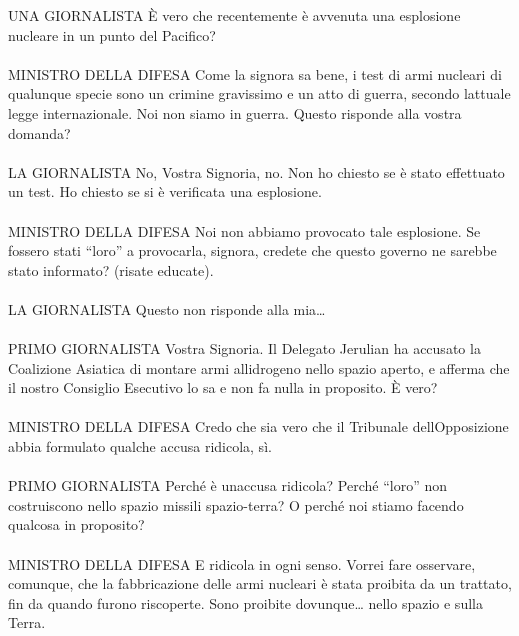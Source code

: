 {\begin{flushleft}
			UNA GIORNALISTA È vero che recentemente è avvenuta una esplosione
			nucleare in un punto del Pacifico?
			\leavevmode\\
			\leavevmode\\
			MINISTRO DELLA DIFESA Come la signora sa bene, i test di armi nucleari
			di qualunque specie sono un crimine gravissimo e un atto di guerra,
			secondo l\textquotesingle attuale legge internazionale. Noi non siamo in
			guerra. Questo risponde alla vostra domanda?
			\leavevmode\\
			\leavevmode\\
			LA GIORNALISTA No, Vostra Signoria, no. Non ho chiesto se è stato
			effettuato un test. Ho chiesto se si è verificata una esplosione.
			\leavevmode\\
			\leavevmode\\
			MINISTRO DELLA DIFESA Noi non abbiamo provocato tale esplosione. Se
			fossero stati ``loro'' a provocarla, signora, credete che questo governo
			ne sarebbe stato informato? (risate educate).
			\leavevmode\\
			\leavevmode\\
			LA GIORNALISTA Questo non risponde alla mia\ldots{}
			\leavevmode\\
			\leavevmode\\
			PRIMO GIORNALISTA Vostra Signoria. Il Delegato Jerulian ha accusato la
			Coalizione Asiatica di montare armi all\textquotesingle idrogeno nello
			spazio aperto, e afferma che il nostro Consiglio Esecutivo lo sa e non
			fa nulla in proposito. È vero?
			\leavevmode\\
			\leavevmode\\
			MINISTRO DELLA DIFESA Credo che sia vero che il Tribunale
			dell\textquotesingle Opposizione abbia formulato qualche accusa
			ridicola, sì.
			\leavevmode\\
			\leavevmode\\
			PRIMO GIORNALISTA Perché è un\textquotesingle accusa ridicola? Perché
			``loro'' non costruiscono nello spazio missili spazio-terra? O perché
			noi stiamo facendo qualcosa in proposito?
			\leavevmode\\
			\leavevmode\\
			MINISTRO DELLA DIFESA E ridicola in ogni senso. Vorrei fare osservare,
			comunque, che la fabbricazione delle armi nucleari è stata proibita da
			un trattato, fin da quando furono riscoperte. Sono proibite
			dovunque\ldots{} nello spazio e sulla Terra.
			\leavevmode\\
			\leavevmode\\

\end{flushleft}}

